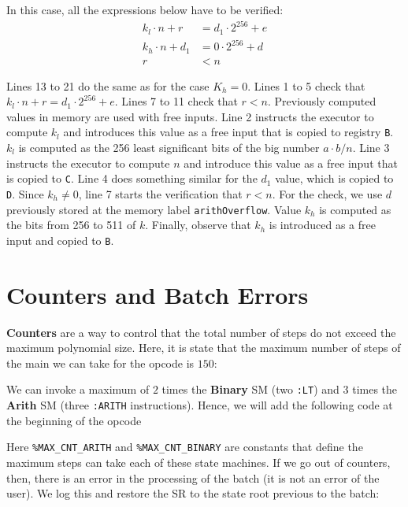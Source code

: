 In this case, all the expressions below have to be verified:
\begin{align*}
k_l \cdot n+r &= d_1 \cdot 2^{256}+e \\
k_h \cdot n+d_1 &= 0 \cdot 2^{256}+d \\
r &< n
\end{align*}

Lines 13 to 21 do the same as for the case $K_h = 0$. Lines 1 to 5 check that $k_l \cdot n + r = d_1 \cdot 2^{256} + e$. Lines 7 to 11 check that $r < n$. Previously computed values in memory are used with free inputs. Line 2 instructs the executor to compute $k_l$ and introduces this value as a free input that is copied to registry \texttt{B}. $k_l$ is computed as the 256 least significant bits of the big number $a \cdot b/n$. Line 3 instructs the executor to compute $n$ and introduce this value as a free input that is copied to \texttt{C}. Line 4 does something similar for the $d_1$ value, which is copied to \texttt{D}. Since $k_h \neq 0$, line 7 starts the verification that $r < n$. For the check, we use $d$ previously stored at the memory label \texttt{arithOverflow}. Value $k_h$ is computed as the bits from 256 to 511 of $k$. Finally, observe that $k_h$ is introduced as a free input and copied to \texttt{B}.


\section{Counters and Batch Errors}

\textbf{Counters} are a way to control that the total number of steps do not exceed the maximum polynomial size. Here, it is state that the maximum number of steps of the main we can take for the opcode is $150$:


\begin{zkasm}
\end{zkasm}

We can invoke a maximum of $2$ times the \textbf{Binary} SM (two \texttt{:LT}) and $3$ times the \textbf{Arith} SM (three \texttt{:ARITH} instructions). Hence, we will add the following code at the beginning of the opcode


\begin{zkasm}
\end{zkasm}

Here \texttt{\%MAX\_CNT\_ARITH} and \texttt{\%MAX\_CNT\_BINARY} are constants that define the maximum steps can take each of these state machines. If we go out of counters, then, there is an error in the processing of the batch (it is not an error of the user). We log this and restore the SR to the state root previous to the batch:


